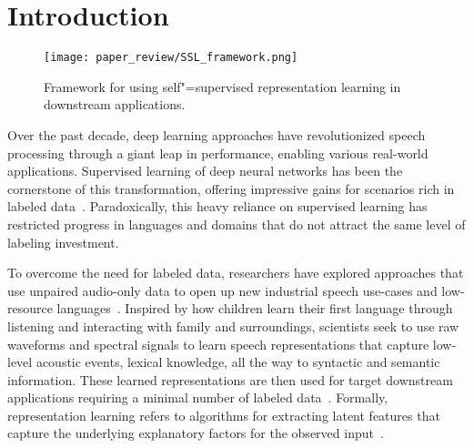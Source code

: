

\section{Introduction}

\begin{figure}
    \centering
    \texttt{[image: paper\_review/SSL\_framework.png]}
	 \caption{Framework for using self"=supervised representation learning in
	 downstream applications.}
    \label{fig:SSL_framework}
\end{figure}


Over the past decade, deep learning approaches have revolutionized speech processing
through a giant leap in performance, enabling various real-world applications.
Supervised learning of deep neural networks has been the cornerstone of this
transformation, offering impressive gains for scenarios rich in labeled
data~\parencite{lecun_deep_2015,hinton_deep_2012,bourlard_connectionist_1994}. 
Paradoxically, this heavy reliance on supervised learning has restricted progress in
languages and domains that do not attract the same level of labeling
investment. 

To overcome the need for labeled data, researchers have explored approaches that use
unpaired audio-only data to open up new industrial speech use-cases and
low-resource languages~\parencite{kemp_unsupervised_1999, lamel_lightly_2002, ma_unsupervised_2006}. Inspired by how
children learn their first language through listening and interacting with
family and surroundings, scientists seek to use raw waveforms and
spectral signals to learn speech representations that capture low-level
acoustic events, lexical knowledge, all the way to syntactic and semantic
information. These learned representations are then used for target downstream
applications requiring a minimal number of labeled data~\parencite{hinton_learning_2007,
lecun_tutorial_2006, bengio_representation_2013}. 
Formally, representation learning refers to algorithms for extracting latent
features that capture the underlying explanatory factors for the observed
input~\parencite{bengio_representation_2013}. 

